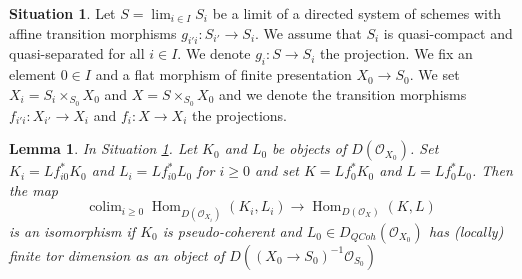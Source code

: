\documentclass{stacks-project}
\theoremstyle{plain}
\newtheorem{lemma}[subsection]{Lemma}
\theoremstyle{definition}
\newtheorem{situation}[subsection]{Situation}
\theoremstyle{remark}
\numberwithin{equation}{subsection}
\def\lim{\mathop{\mathrm{lim}}\nolimits}
\def\colim{\mathop{\mathrm{colim}}\nolimits}
\def\Hom{\mathop{\mathrm{Hom}}\nolimits}
\def\QCoh{\mathit{QCoh}}
\begin{document}
\begin{situation}
\label{situation-relative-descent}
Let $S = \lim_{i \in I} S_i$ be a limit of a directed system of schemes
with affine transition morphisms $g_{i'i} : S_{i'} \to S_i$.
We assume that $S_i$ is quasi-compact and quasi-separated for all $i \in I$.
We denote $g_i : S \to S_i$ the projection. We fix an element $0 \in I$
and a flat morphism of finite presentation $X_0 \to S_0$.
We set $X_i = S_i \times_{S_0} X_0$ and $X = S \times_{S_0} X_0$
and we denote the transition morphisms $f_{i'i} : X_{i'} \to X_i$
and $f_i : X \to X_i$ the projections.
\end{situation}

\begin{lemma}
\label{lemma-relative-descend-homomorphisms}
In Situation \ref{situation-relative-descent}.
Let $K_0$ and $L_0$ be objects of $D(\mathcal{O}_{X_0})$.
Set $K_i = Lf_{i0}^*K_0$ and $L_i = Lf_{i0}^*L_0$ for $i \geq 0$
and set $K = Lf_0^*K_0$ and $L = Lf_0^*L_0$. Then the map
$$
\colim_{i \geq 0} \Hom_{D(\mathcal{O}_{X_i})}(K_i, L_i)
\longrightarrow
\Hom_{D(\mathcal{O}_X)}(K, L)
$$
is an isomorphism if $K_0$ is pseudo-coherent and
$L_0 \in D_\QCoh(\mathcal{O}_{X_0})$ has (locally)
finite tor dimension as an object of
$D((X_0 \to S_0)^{-1}\mathcal{O}_{S_0})$
\end{lemma}
\end{document}
